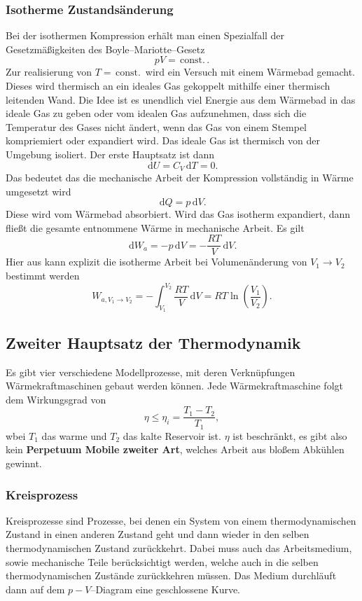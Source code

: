 \documentclass[a4paper,12pt]{article}
\newcommand{\td}{\,\text{d}}
\begin{document}
\subsubsection{Isotherme Zustandsänderung}
Bei der isothermen Kompression erhält man einen Spezialfall der Gesetzmäßigkeiten des Boyle--Mariotte--Gesetz
\[ 
        pV=\,\text{const.}\,
.\] 
Zur realisierung von $T=\,\text{const.}\,$ wird ein Versuch mit einem Wärmebad gemacht. Dieses wird thermisch an ein ideales Gas gekoppelt mithilfe einer thermisch leitenden Wand. Die Idee ist es \glqq unendlich\grqq{} viel Energie aus dem Wärmebad in das ideale Gas zu geben oder vom idealen Gas aufzunehmen, dass sich die Temperatur des Gases nicht ändert, wenn das Gas von einem Stempel kompriemiert oder expandiert wird. Das ideale Gas ist thermisch von der Umgebung isoliert. Der erste Hauptsatz ist dann
\[ 
        \td U=C_V\td T=0
.\] 
Das bedeutet das die mechanische Arbeit der Kompression vollständig in Wärme umgesetzt wird
\[ 
        \td Q=p\td V
.\] 
Diese wird vom Wärmebad absorbiert. Wird das Gas isotherm expandiert, dann fließt die gesamte entnommene Wärme in mechanische Arbeit. Es gilt
\[ 
        \td W_a=-p\td V=-\dfrac{RT}{V}\td V
.\] 
Hier aus kann explizit die isotherme Arbeit bei Volumenänderung von $V_1\rightarrow V_2$ bestimmt werden
\[ 
        W_{a,V_1\rightarrow V_2}=-\int_{V_1}^{V_2}\dfrac{RT}{V}\td V=RT\ln\left(\dfrac{V_1}{V_2}\right)
.\]  

\subsection{Zweiter Hauptsatz der Thermodynamik}
Es gibt vier verschiedene Modellprozesse, mit deren Verknüpfungen Wärmekraftmaschinen \glqq gebaut\grqq{} werden können. Jede Wärmekraftmaschine folgt dem Wirkungsgrad von
\[ 
        \eta \leq \eta _i=\dfrac{T_1-T_2}{T_1}
,\] 
wbei $T_1$ das warme und $T_2$ das kalte Reservoir ist. $\eta $ ist beschränkt, es gibt also kein \textbf{Perpetuum Mobile zweiter Art}, welches Arbeit aus bloßem Abkühlen gewinnt.

\subsubsection{Kreisprozess}
Kreisprozesse sind Prozesse, bei denen ein System von einem thermodynamischen Zustand in einen anderen Zustand geht und dann wieder in den selben thermodynamischen Zustand zurückkehrt. Dabei muss auch das Arbeitsmedium, sowie mechanische Teile berücksichtigt werden, welche auch in die selben thermodynamischen Zustände zurückkehren müssen. Das Medium durchläuft dann auf dem $p-V$--Diagram eine geschlossene Kurve.
\end{document}
